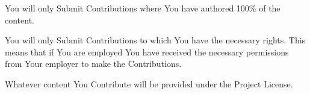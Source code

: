 
\begin{DoxyItemize}
\item You will only Submit Contributions where You have authored 100\% of the content.
\item You will only Submit Contributions to which You have the necessary rights. This means that if You are employed You have received the necessary permissions from Your employer to make the Contributions.
\item Whatever content You Contribute will be provided under the Project License. 
\end{DoxyItemize}